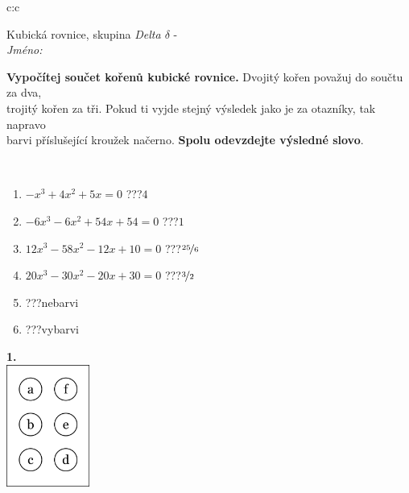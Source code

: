 \documentclass[10pt]{report}
\begin{document}
\begin{tabular}{c:c}
\begin{minipage}[c][104.5mm][t]{0.5\linewidth}
\begin{center}
\vspace{7mm}
{\huge Kubická rovnice, skupina \textit{Delta $\delta$} -}\\[5mm]
\textit{Jméno:}\phantom{xxxxxxxxxxxxxxxxxxxxxxxxxxxxxxxxxxxxxxxxxxxxxxxxxxxxxxxxxxxxxxxxx}\\[5mm]
\begin{minipage}{0.95\linewidth}
\begin{center}
\textbf{Vypočítej součet kořenů kubické rovnice.} Dvojitý kořen považuj do součtu za dva,\\trojitý kořen za tři. Pokud ti vyjde stejný výsledek jako je za otazníky, tak napravo\\barvi příslušející kroužek načerno. \textbf{Spolu odevzdejte výsledné slovo}.
\end{center}
\end{minipage}
\\[1mm]
\begin{minipage}{0.79\linewidth}
\begin{center}
\begin{varwidth}{\linewidth}
\begin{enumerate}
\Large
\item $-x^3+4x^2+5x=0$\quad \dotfill\; ???\;\dotfill \quad $4$
\item $-6x^3-6x^2+54x+54=0$\quad \dotfill\; ???\;\dotfill \quad $1$
\item $12x^3-58x^2-12x+10=0$\quad \dotfill\; ???\;\dotfill \quad $\nicefrac{25}{6}$
\item $20x^3-30x^2-20x+30=0$\quad \dotfill\; ???\;\dotfill \quad $\nicefrac{3}{2}$
\item \quad \dotfill\; ???\;\dotfill \quad nebarvi
\item \quad \dotfill\; ???\;\dotfill \quad vybarvi
\end{enumerate}
\end{varwidth}
\end{center}
\end{minipage}
\begin{minipage}{0.20\linewidth}
\begin{center}
{\Huge\bfseries 1.} \\[2mm]
\includegraphics[height=40mm]{../images/braille.png}

\end{center}
\end{minipage}
\end{center}
\end{minipage}
\end{tabular}
\end{document}
